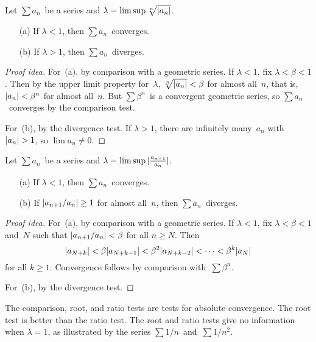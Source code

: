 \begin{cor}
Let \(\sum a_n\)~be a series and \(\lambda=\limsup\sqrt[n]{|{a_n}|}\).
\begin{enumerate}[itemsep=0pt]
\item[(a)] If \(\lambda<1\), then \(\sum a_n\)~converges.
\item[(b)] If \(\lambda>1\), then \(\sum a_n\)~diverges.
\end{enumerate}
\end{cor}
\begin{proof}[Proof idea]
For~(a), by comparison with a geometric series. If \(\lambda<1\), fix \(\lambda<\beta<1\). Then by the upper limit property for~\(\lambda\), \(\sqrt[n]{|{a_n}|}<\beta\) for almost all~\(n\), that is, \(|{a_n}|<\beta^n\) for almost all~\(n\). But \(\sum\beta^n\)~is a convergent geometric series, so \(\sum a_n\)~converges by the comparison test.

For~(b), by the divergence test. If \(\lambda>1\), there are infinitely many~\(a_n\) with \(\abs{a_n}>1\), so \(\lim a_n\ne 0\).
\end{proof}

\begin{cor}
Let \(\sum a_n\)~be a series and \(\lambda=\limsup|{\frac{a_{n+1}}{a_n}}|\).
\begin{enumerate}[itemsep=0pt]
\item[(a)] If \(\lambda<1\), then \(\sum a_n\)~converges.
\item[(b)] If \(|{a_{n+1}/a_n}|\ge 1\) for almost all~\(n\), then \(\sum a_n\)~diverges.
\end{enumerate}
\end{cor}
\begin{proof}[Proof idea]
For~(a), by comparison with a geometric series. If \(\lambda<1\), fix \(\lambda<\beta<1\) and~\(N\) such that \(|{a_{n+1}/a_n}|<\beta\) for all \(n\ge N\). Then
\[|{a_{N+k}}|<\beta|{a_{N+k-1}}|<\beta^2|{a_{N+k-2}}|<\cdots<\beta^k|{a_N}|\]
for all \(k\ge1\). Convergence follows by comparison with~\(\sum\beta^n\).

For~(b), by the divergence test.
\end{proof}

\begin{rmk}
The comparison, root, and ratio tests are tests for absolute convergence. The root test is better than the ratio test. The root and ratio tests give no information when \(\lambda=1\), as illustrated by the series \(\sum 1/n\)~and~\(\sum 1/n^2\).
\end{rmk}

